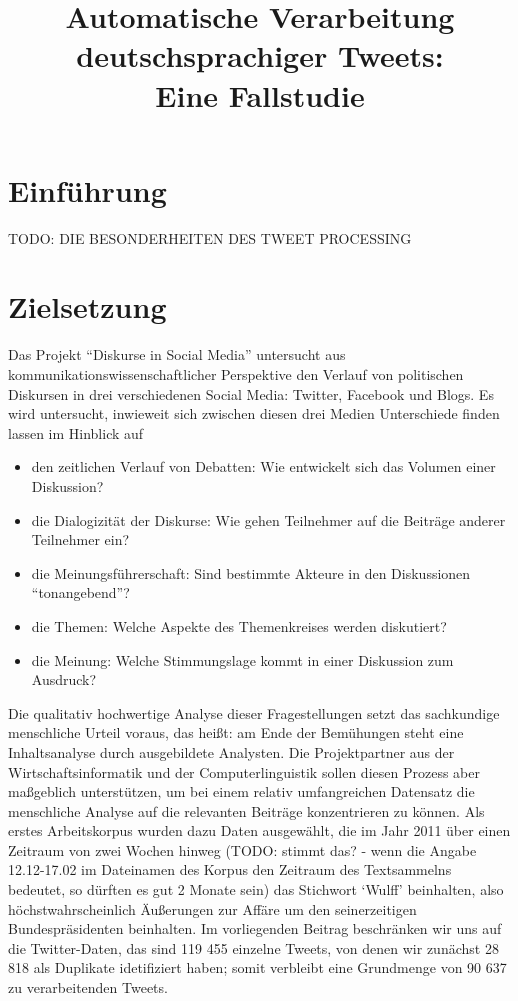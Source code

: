 \documentclass[11pt]{article}
\title{Automatische Verarbeitung deutschsprachiger Tweets:\\ Eine Fallstudie}
\author{}
\date{}
\begin{document}
\maketitle

\thispagestyle{empty}




\section{Einführung}

TODO: DIE BESONDERHEITEN DES TWEET PROCESSING


\section{Zielsetzung}

Das Projekt ``Diskurse in Social Media'' untersucht aus
kommunikationswissenschaftlicher Perspektive den Verlauf von
politischen Diskursen in drei verschiedenen Social Media: Twitter,
Facebook und Blogs. Es wird untersucht, inwieweit sich zwischen diesen
drei Medien Unterschiede finden lassen im Hinblick auf
\begin{itemize}
\item den zeitlichen Verlauf von Debatten: Wie entwickelt sich das
  Volumen einer Diskussion?
\item die Dialogizität der Diskurse: Wie gehen Teilnehmer auf die
  Beiträge anderer Teilnehmer ein?
\item die Meinungsführerschaft: Sind bestimmte Akteure in den
  Diskussionen ``tonangebend''?
\item die Themen: Welche Aspekte des Themenkreises werden diskutiert?
\item die Meinung: Welche Stimmungslage kommt in einer Diskussion zum Ausdruck?
\end{itemize}
Die qualitativ hochwertige Analyse dieser Fragestellungen setzt das
sachkundige menschliche Urteil voraus, das heißt: am Ende der
Bemühungen steht eine Inhaltsanalyse durch ausgebildete Analysten. Die
Projektpartner aus der Wirtschaftsinformatik und der
Computerlinguistik sollen diesen Prozess aber maßgeblich unterstützen,
um bei einem relativ umfangreichen Datensatz die menschliche Analyse
auf die relevanten Beiträge konzentrieren zu können. Als erstes
Arbeitskorpus wurden dazu Daten ausgewählt, die im Jahr 2011 über
einen Zeitraum von zwei Wochen hinweg (TODO: stimmt das? - wenn die
Angabe 12.12-17.02 im Dateinamen des Korpus den Zeitraum des
Textsammelns bedeutet, so d\"urften es gut 2 Monate sein) das
Stichwort `Wulff' beinhalten, also höchstwahrscheinlich Äußerungen zur
Affäre um den seinerzeitigen Bundespräsidenten beinhalten. Im
vorliegenden Beitrag beschränken wir uns auf die Twitter-Daten, das
sind 119 455 einzelne Tweets, von denen wir zunächst 28 818 als
Duplikate idetifiziert haben; somit verbleibt eine Grundmenge von 90
637 zu verarbeitenden Tweets.
\end{document}
